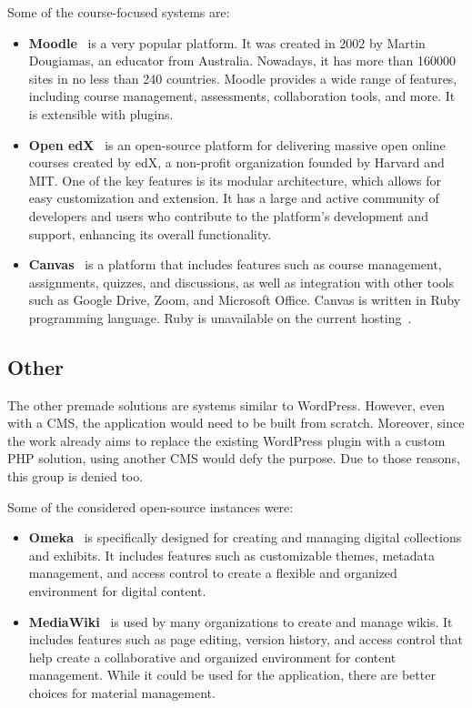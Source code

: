 \documentclass[
  digital,     %
  oneside,     %
  nosansbold,  %
  colorbold, %
  lof,         %
  lot,         %
]{fithesis4}
\begin{document}
Some of the course-focused systems are:
\begin{itemize}

	\item \textbf{Moodle}~\cite{https://moodle.org/} is a very popular platform. It was created in 2002 by Martin Dougiamas, an educator from Australia. Nowadays, it has more than 160000 sites in no less than 240 countries. Moodle provides a wide range of features, including course management, assessments, collaboration tools, and more. It is extensible with plugins.

	\item \textbf{Open edX}~\cite{https://openedx.org/} is an open-source platform for delivering massive open online courses created by edX, a non-profit organization founded by Harvard and MIT. One of the key features is its modular architecture, which allows for easy customization and extension. It has a large and active community of developers and users who contribute to the platform's development and support, enhancing its overall functionality.

	\item \textbf{Canvas}~\cite{https://github.com/instructure/canvas-lms} is a platform that includes features such as course management, assignments, quizzes, and discussions, as well as integration with other tools such as Google Drive, Zoom, and Microsoft Office. Canvas is written in Ruby programming language. Ruby is unavailable on the current hosting~\cite{https://w3techs.com/sites/info/forpsi.com}.

\end{itemize}

\subsection{Other}

The other premade solutions are systems similar to WordPress. However, even with a CMS, the application would need to be built from scratch. Moreover, since the work already aims to replace the existing WordPress plugin with a custom PHP solution, using another CMS would defy the purpose. Due to those reasons, this group is denied too.

Some of the considered open-source instances were:
\begin{itemize}
	\item \textbf{Omeka}~\cite{https://omeka.org/} is specifically designed for creating and managing digital collections and exhibits. It includes features such as customizable themes, metadata management, and access control to create a flexible and organized environment for digital content.
	\item \textbf{MediaWiki}~\cite{https://www.mediawiki.org/wiki/MediaWiki} is used by many organizations to create and manage wikis. It includes features such as page editing, version history, and access control that help create a collaborative and organized environment for content management. While it could be used for the application, there are better choices for material management.
\end{itemize}
\end{document}

